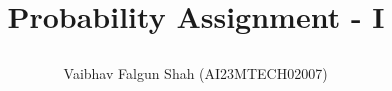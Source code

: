 \documentclass[journal,12pt,twocolumn]{IEEEtran}
\DeclareMathOperator*{\Res}{Res}
\begin{document}
%


\newtheorem{theorem}{Theorem}[section]
\newtheorem{problem}{Problem}
\newtheorem{proposition}{Proposition}[section]
\newtheorem{lemma}{Lemma}[section]
\newtheorem{corollary}[theorem]{Corollary}
\newtheorem{example}{Example}[section]
\newtheorem{definition}[problem]{Definition}

\newcommand{\BEQA}{\begin{eqnarray}}
\newcommand{\EEQA}{\end{eqnarray}}
\newcommand{\define}{\stackrel{\triangle}{=}}


\providecommand{\mbf}{\mathbf}
\providecommand{\pr}[1]{\ensuremath{\Pr\left(#1\right)}}
\providecommand{\qfunc}[1]{\ensuremath{Q\left(#1\right)}}
\providecommand{\sbrak}[1]{\ensuremath{{}\left[#1\right]}}
\providecommand{\lsbrak}[1]{\ensuremath{{}\left[#1\right.}}
\providecommand{\rsbrak}[1]{\ensuremath{{}\left.#1\right]}}
\providecommand{\brak}[1]{\ensuremath{\left(#1\right)}}
\providecommand{\lbrak}[1]{\ensuremath{\left(#1\right.}}
\providecommand{\rbrak}[1]{\ensuremath{\left.#1\right)}}
\providecommand{\cbrak}[1]{\ensuremath{\left\{#1\right\}}}
\providecommand{\lcbrak}[1]{\ensuremath{\left\{#1\right.}}
\providecommand{\rcbrak}[1]{\ensuremath{\left.#1\right\}}}
\theoremstyle{remark}
\newtheorem{rem}{Remark}
\newcommand{\sgn}{\mathop{\mathrm{sgn}}}
\providecommand{\abs}[1]{\left\vert#1\right\vert}
\providecommand{\res}[1]{\Res\displaylimits_{#1}} 
\providecommand{\norm}[1]{\left\lVert#1\right\rVert}

\providecommand{\mtx}[1]{\mathbf{#1}}
\providecommand{\mean}[1]{E\left[ #1 \right]}
\providecommand{\fourier}{\overset{\mathcal{F}}{ \rightleftharpoons}}

\providecommand{\system}{\overset{\mathcal{H}}{ \longleftrightarrow}}
 
\newcommand{\solution}{\noindent \textbf{Solution: }}
\newcommand{\cosec}{\,\text{cosec}\,}
\providecommand{\dec}[2]{\ensuremath{\overset{#1}{\underset{#2}{\gtrless}}}}
\newcommand{\myvec}[1]{\ensuremath{\begin{pmatrix}#1\end{pmatrix}}}
\newcommand{\mydet}[1]{\ensuremath{\begin{vmatrix}#1\end{vmatrix}}}

\let\vec\mathbf

\vspace{3cm}
\title{

Probability Assignment - I

}
\author{ Vaibhav Falgun Shah (AI23MTECH02007)$^{}$
} 
\end{document}
